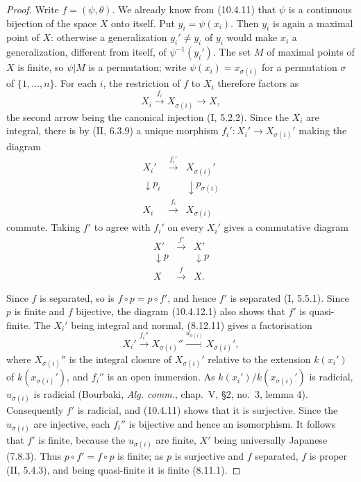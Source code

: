 \begin{proof}
Write $f=(\psi,\theta)$.  We already know from (10.4.11) that $\psi$ is
a continuous bijection of the space $X$ onto itself.  Put
$y_i=\psi(x_i)$.  Then $y_i$ is again a maximal point of $X$: otherwise
a generalization $y_i'\neq y_i$ of $y_i$ would make $x_i$ a
generalization, different from itself, of $\psi^{-1}(y_i')$.  The set
$M$ of maximal points of $X$ is finite, so $\psi|M$ is a permutation;
write $\psi(x_i)=x_{\sigma(i)}$ for a permutation $\sigma$ of
$\{1,\ldots,n\}$.  For each $i$, the restriction of $f$ to $X_i$
therefore factors as
\[
 X_i\xrightarrow{f_i}X_{\sigma(i)}\longrightarrow X,
\]
the second arrow being the canonical injection (I, 5.2.2).  Since the
$X_i$ are integral, there is by (II, 6.3.9) a unique morphism
$f_i':X_i'\to X_{\sigma(i)}'$ making the diagram
\[
\begin{array}{ccc}
X_i'&\xrightarrow{f_i'}&X_{\sigma(i)}'\\
\downarrow p_i&&\downarrow p_{\sigma(i)}\\
X_i&\xrightarrow{f_i}&X_{\sigma(i)}
\end{array}
\]
commute.  Taking $f'$ to agree with $f_i'$ on every $X_i'$ gives a
commutative diagram
\begin{equation}
\label{IV.10.4.12.1.errata}
\begin{array}{ccc}
X'&\xrightarrow{f'}&X'\\
\downarrow p&&\downarrow p\\
X&\xrightarrow{f}&X.
\end{array}
\tag{10.4.12.1}
\end{equation}

Since $f$ is separated, so is $f\circ p=p\circ f'$, and hence $f'$ is
separated (I, 5.5.1).  Since $p$ is finite and $f$ bijective, the
diagram (10.4.12.1) also shows that $f'$ is quasi-finite.  The
$X_i'$ being integral and normal, (8.12.11) gives a factorisation
\[
 X_i'\xrightarrow{f_i''}X_{\sigma(i)}''
 \xrightarrow{u_{\sigma(i)}}X_{\sigma(i)}',
\]
where $X_{\sigma(i)}''$ is the integral closure of
$X_{\sigma(i)}'$ relative to the extension $k(x_i')$ of
$k(x_{\sigma(i)}')$, and $f_i''$ is an open immersion.  As
$k(x_i')/k(x_{\sigma(i)}')$ is radicial, $u_{\sigma(i)}$ is radicial
(Bourbaki, \emph{Alg. comm.}, chap.~V, \S2, no.~3, lemma 4).
Consequently $f'$ is radicial, and (10.4.11) shows that it is
surjective.  Since the $u_{\sigma(i)}$ are injective, each $f_i''$ is
bijective and hence an isomorphism.  It follows that $f'$ is finite,
because the $u_{\sigma(i)}$ are finite, $X'$ being universally
Japanese (7.8.3).  Thus $p\circ f'=f\circ p$ is finite; as $p$ is
surjective and $f$ separated, $f$ is proper (II, 5.4.3), and being
quasi-finite it is finite (8.11.1).


\end{proof}
